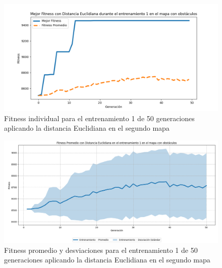\documentclass[conference]{IEEEtran}
\begin{document}
\begin{figure}[H]
    \centering
    \includegraphics[width=0.9 \linewidth]{Euclidiana/Mapa2/Fitness_1_Map2_Eucli_50Gen.png}
    \caption{Fitness individual para el entrenamiento 1 de 50 generaciones aplicando la distancia Euclidiana en el segundo mapa}
    \label{fig:eucli_1_50_m2}
\end{figure}
\begin{figure}[H]
    \centering
    \includegraphics[width=0.9 \linewidth]{Euclidiana/Mapa2/Fitness_1_Map2_Eucli_50Gen_Sombra.png}
    \caption{Fitness promedio y desviaciones para el entrenamiento 1 de 50 generaciones aplicando la distancia Euclidiana en el segundo mapa}
    \label{fig:eucli_1_50_sombra_m2}
\end{figure}
\end{document}
